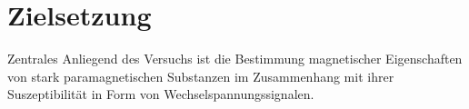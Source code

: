 \section{Zielsetzung}
Zentrales Anliegend des Versuchs ist die Bestimmung magnetischer Eigenschaften von stark paramagnetischen Substanzen im
Zusammenhang mit ihrer Suszeptibilität in Form von Wechselspannungssignalen. 

